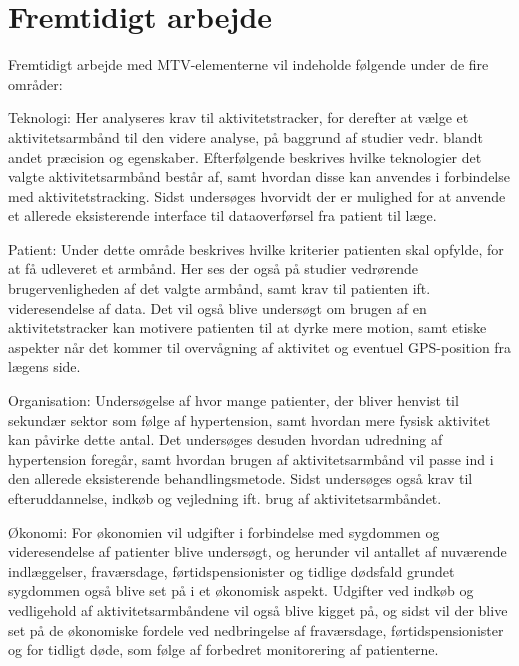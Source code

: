 \section{Fremtidigt arbejde}

Fremtidigt arbejde med MTV-elementerne vil indeholde følgende under de fire områder:

Teknologi:
Her analyseres krav til aktivitetstracker, for derefter at vælge et aktivitetsarmbånd til den videre analyse, på baggrund af studier vedr. blandt andet præcision og egenskaber. Efterfølgende beskrives hvilke teknologier det valgte aktivitetsarmbånd består af, samt hvordan disse kan anvendes i forbindelse med aktivitetstracking. Sidst undersøges hvorvidt der er mulighed for at anvende et allerede eksisterende interface til dataoverførsel fra patient til læge.

Patient: 
Under dette område beskrives hvilke kriterier patienten skal opfylde, for at få udleveret et armbånd. Her ses der også på studier vedrørende brugervenligheden af det valgte armbånd, samt krav til patienten ift. videresendelse af data. Det vil også blive undersøgt om brugen af en aktivitetstracker kan motivere patienten til at dyrke mere motion, samt etiske aspekter når det kommer til overvågning af aktivitet og eventuel GPS-position fra lægens side. 

Organisation: 
Undersøgelse af hvor mange patienter, der bliver henvist til sekundær sektor som følge af hypertension, samt hvordan mere fysisk aktivitet kan påvirke dette antal. Det undersøges desuden hvordan udredning af hypertension foregår, samt hvordan brugen af aktivitetsarmbånd vil passe ind i den allerede eksisterende behandlingsmetode. Sidst undersøges også krav til efteruddannelse, indkøb og vejledning ift. brug af aktivitetsarmbåndet.

Økonomi:
For økonomien vil udgifter i forbindelse med sygdommen og videresendelse af patienter blive undersøgt, og herunder vil antallet af nuværende indlæggelser, fraværsdage, førtidspensionister og tidlige dødsfald grundet sygdommen også blive set på i et økonomisk aspekt. Udgifter ved indkøb og vedligehold af aktivitetsarmbåndene vil også blive kigget på, og sidst vil der blive set på de økonomiske fordele ved nedbringelse af fraværsdage, førtidspensionister og for tidligt døde, som følge af forbedret monitorering af patienterne. 